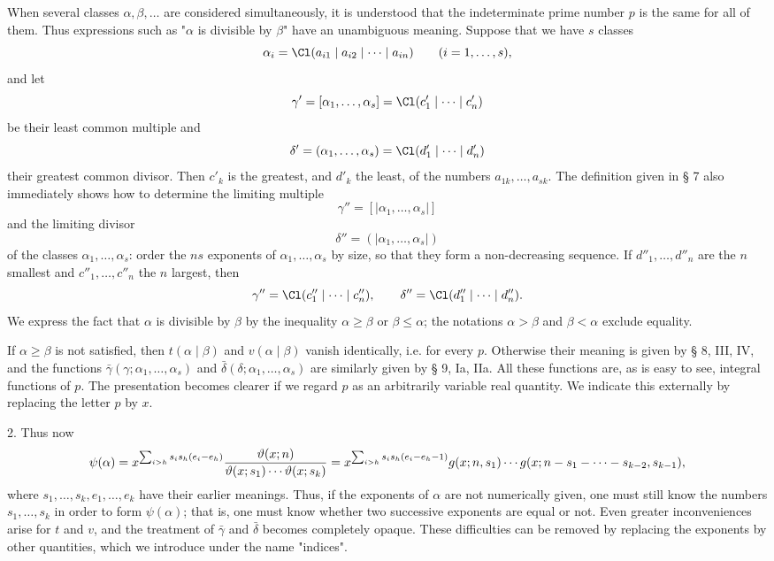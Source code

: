 When several classes $\alpha,\beta,\ldots$ are considered simultaneously, it is understood that the indeterminate prime number $p$ is the same for all of them. Thus expressions such as "$\alpha$ is divisible by $\beta$" have an unambiguous meaning. Suppose that we have $s$ classes
\[
 \alpha_i=\Cl(a_{i1}\mid a_{i2}\mid\cdots\mid a_{in})\qquad (i=1,\ldots,s),
\]
and let
\[
 \gamma'=[\alpha_1,\ldots,\alpha_s]=\Cl(c'_1\mid\cdots\mid c'_n)
\]
be their least common multiple and
\[
 \delta'=(\alpha_1,\ldots,\alpha_s)=\Cl(d'_1\mid\cdots\mid d'_n)
\]
their greatest common divisor. Then $c'_k$ is the greatest, and $d'_k$ the least, of the numbers $a_{1k},\ldots,a_{sk}$. The definition given in § 7 also immediately shows how to determine the limiting multiple
\[
 \gamma''=[|\alpha_1,\ldots,\alpha_s|]
\]
and the limiting divisor
\[
 \delta''=(|\alpha_1,\ldots,\alpha_s|)
\]
of the classes $\alpha_1,
\ldots,\alpha_s$: order the $ns$ exponents of $\alpha_1,
\ldots,\alpha_s$ by size, so that they form a non-decreasing sequence. If $d''_1,
\ldots,d''_n$ are the $n$ smallest and $c''_1,
\ldots,c''_n$ the $n$ largest, then
\[
 \gamma''=\Cl(c''_1\mid\cdots\mid c''_n),\qquad
 \delta''=\Cl(d''_1\mid\cdots\mid d''_n).
\]
We express the fact that $\alpha$ is divisible by $\beta$ by the inequality $\alpha\ge\beta$ or $\beta\le\alpha$; the notations $\alpha>\beta$ and $\beta<\alpha$ exclude equality.

If $\alpha\ge\beta$ is not satisfied, then $t(\alpha\mid\beta)$ and $v(\alpha\mid\beta)$ vanish identically, i.e. for every $p$. Otherwise their meaning is given by § 8, III, IV, and the functions $\bar\gamma(\gamma;\alpha_1,\ldots,\alpha_s)$ and $\bar\delta(\delta;\alpha_1,\ldots,\alpha_s)$ are similarly given by § 9, Ia, IIa. All these functions are, as is easy to see, integral functions of $p$. The presentation becomes clearer if we regard $p$ as an arbitrarily variable real quantity. We indicate this externally by replacing the letter $p$ by $x$.

2. Thus now
\[
 \psi(\alpha)=x^{\sum_{i>h}s_i s_h(e_i-e_h)}
 {\vartheta(x;n)\over \vartheta(x;s_1)\cdots\vartheta(x;s_k)}
 =x^{\sum_{i>h}s_i s_h(e_i-e_h-1)}
 g(x;n,s_1)\cdots g(x;n-s_1-\cdots-s_{k-2},s_{k-1}),
\]
where $s_1,
\ldots,s_k,e_1,
\ldots,e_k$ have their earlier meanings. Thus, if the exponents of $\alpha$ are not numerically given, one must still know the numbers $s_1,
\ldots,s_k$ in order to form $\psi(\alpha)$; that is, one must know whether two successive exponents are equal or not. Even greater inconveniences arise for $t$ and $v$, and the treatment of $\bar\gamma$ and $\bar\delta$ becomes completely opaque. These difficulties can be removed by replacing the exponents by other quantities, which we introduce under the name "indices".


